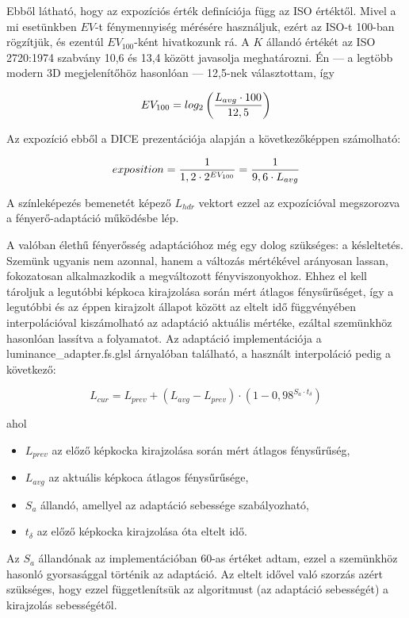 Ebből látható, hogy az expozíciós érték definíciója függ az ISO értéktől. Mivel a mi esetünkben \(EV\)-t fénymennyiség mérésére használjuk, ezért az ISO-t 100-ban rögzítjük, és ezentúl \(EV_{100}\)-ként hivatkozunk rá. A \(K\) állandó értékét az ISO 2720:1974 szabvány 10,6 és 13,4 között javasolja meghatározni. Én --- a legtöbb modern 3D megjelenítőhöz hasonlóan --- 12,5-nek választottam, így

\[
EV_{100} = log_2\left({ L_{avg} \cdot 100 } \over 12,5\right)
\]

\noindent
Az expozíció ebből a DICE prezentációja alapján a következőképpen számolható:

\[
exposition = { 1 \over { 1,2 \cdot 2^{EV_{100}} } } = { 1 \over { 9,6 \cdot L_{avg} } }
\]

A színleképezés bemenetét képező \(L_{hdr}\) vektort ezzel az expozícióval megszorozva a fényerő-adaptáció működésbe lép.

A valóban élethű fényerősség adaptációhoz még egy dolog szükséges: a késleltetés. Szemünk ugyanis nem azonnal, hanem a változás mértékével arányosan lassan, fokozatosan alkalmazkodik a megváltozott fényviszonyokhoz. Ehhez el kell tároljuk a legutóbbi képkoca kirajzolása során mért átlagos fénysűrűséget, így a legutóbbi és az éppen kirajzolt állapot között az eltelt idő függvényében interpolációval kiszámolható az adaptáció aktuális mértéke, ezáltal szemünkhöz hasonlóan lassítva a folyamatot. Az adaptáció implementációja a luminance\_adapter.fs.glsl árnyalóban található, a használt interpoláció pedig a következő:

\[
L_{cur} = L_{prev} + (L_{avg} - L_{prev}) \cdot (1 - 0,98^{S_a \cdot t_{\delta}})
\]

\noindent
ahol

\begin{itemize}[noitemsep]
\item \(L_{prev}\) az előző képkocka kirajzolása során mért átlagos fénysűrűség,
\item \(L_{avg}\) az aktuális képkoca átlagos fénysűrűsége,
\item \(S_a\) állandó, amellyel az adaptáció sebessége szabályozható,
\item \(t_{\delta}\) az előző képkocka kirajzolása óta eltelt idő.
\end{itemize}

Az \(S_a\) állandónak az implementációban 60-as értéket adtam, ezzel a szemünkhöz hasonló gyorsasággal történik az adaptáció. Az eltelt idővel való szorzás azért szükséges, hogy ezzel függetlenítsük az algoritmust (az adaptáció sebességét) a kirajzolás sebességétől.

